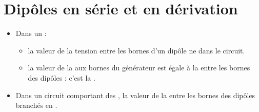 \documentclass[12pt,a4paper]{article}
\begin{document}
\begin{myex}
\end{myex}

\section{Dipôles en série et en dérivation}


\begin{mybilan}
	\begin{itemize}
		\item Dans un  :
		\begin{itemize}
			\item la valeur de la tension entre les bornes d'un dipôle ne  dans le circuit.
			\item la valeur de la  aux bornes du générateur est égale à la  entre les bornes des dipôles : c'est la .
			
			\vspace*{-1cm}
			
		\end{itemize}
	
		\item Dans un circuit comportant des , la valeur de la  entre les bornes des dipôles branchés en .
		
		\vspace*{-1cm}
		
	\end{itemize}
\end{mybilan}


\begin{myex}
\end{myex}
\end{document}
